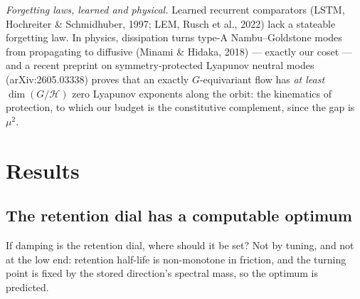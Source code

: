 \documentclass{article}
\begin{document}
{\emph{Forgetting laws, learned and physical.} Learned recurrent comparators (LSTM, Hochreiter \& Schmidhuber, 1997; LEM, Rusch et al., 2022) lack a stateable forgetting law. In physics, dissipation turns type-A Nambu--Goldstone modes from propagating to diffusive (Minami \& Hidaka, 2018) --- exactly our coset --- and a recent preprint on symmetry-protected Lyapunov neutral modes (arXiv:2605.03338) proves that an exactly $G$-equivariant flow has \emph{at least} $\dim(G/\mathcal H)$ zero Lyapunov exponents along the orbit: the kinematics of protection, to which our budget is the constitutive complement, since the gap is $\mu^2$.\par}

\section{Results}\label{sec:results}

\subsection{The retention dial has a computable optimum}\label{sec:vcurve}

If damping is the retention dial, where should it be set? Not by tuning, and not at the low end: retention half-life is non-monotone in friction, and the turning point is fixed by the stored direction's spectral mass, so the optimum is predicted.
\end{document}
